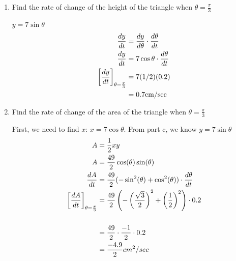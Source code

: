 \documentclass{ximera}
\begin{document}
\begin{problem}
\begin{enumerate}
\begin{explanation}
		\end{explanation}
\item Find the rate of change of the height of the triangle when $\theta=\frac{\pi}{3}$
\begin{explanation}
		$y=7\sin{\theta}$
		\begin{align*}
		\frac{dy}{dt}&=\frac{dy}{d\theta}\cdot \frac{d\theta}{dt}\\
		\frac{dy}{dt}&=7\cos{\theta} \cdot \frac{d\theta}{dt}\\
		\bigg[ \frac{dy}{dt} \bigg]_{\theta=\frac{\pi}{3}}&=7(1/2)(0.2)\\
		&=0.7 \text{cm/sec}
		\end{align*}
				\end{explanation}
	\item Find the rate of change of the area of the triangle when $\theta=\frac{\pi}{3}$
\begin{explanation}
		First, we need to find $x$: $x=7 \cos{\theta}$.  From part c, we know $y=7\sin{\theta}$
		\begin{align*}
		A&=\frac{1}{2}xy\\
		A&=\frac{49}{2}\cos(\theta)\sin(\theta)\\
		\frac{dA}{dt}&=\frac{49}{2}(-\sin^2(\theta)+\cos^2(\theta)) \cdot \frac{d\theta}{dt}\\
		\bigg[ \frac{dA}{dt} \bigg]_{\theta=\frac{\pi}{3}}&=\frac{49}{2}\left(-\left(\frac{\sqrt{3}}{2}\right)^2+\left(\frac{1}{2}\right)^2 \right) \cdot 0.2\\\\
		&=\frac{49}{2}\cdot \frac{-1}{2} \cdot 0.2\\
		&=\frac{-4.9}{2} cm^2/sec
		\end{align*}
		\end{explanation}

\end{enumerate}
\end{problem}
\end{document}
